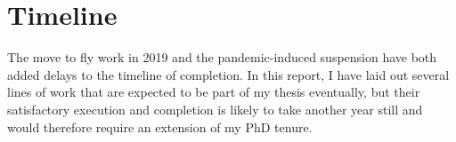 \documentclass[12pt,onecolumn,twoside]{article}
\begin{document}
	\section{Timeline}
	The move to fly work in 2019 and the pandemic-induced suspension have both added delays to the timeline of completion. In this report, I have laid out several lines of work that are expected to be part of my thesis eventually, but their satisfactory execution and completion is likely to take another year still and would therefore require an extension of my PhD tenure.

	
	
\end{document}
